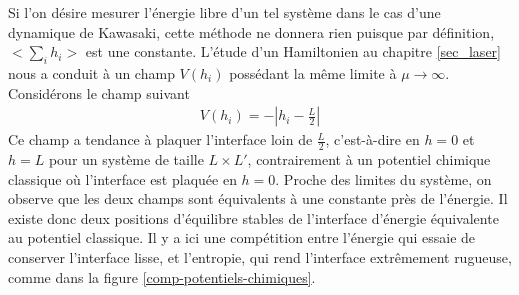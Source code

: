 Si l'on désire mesurer l'énergie libre d'un tel système dans le cas d'une dynamique de Kawasaki, cette méthode ne donnera rien puisque par définition, $<\sum_i h_i>$ est une constante. L'étude d'un Hamiltonien au chapitre \ref{sec_laser} nous a conduit à un champ $V(h_i)$ possédant la même limite à $\mu \to \infty$. Considérons le champ suivant
\begin{align}
    V(h_i) = - |h_i-\frac{L}{2}|
    \label{neggstaged}
\end{align}
Ce champ a tendance à plaquer l'interface loin de $\frac{L}{2}$, c'est-à-dire en $h=0$ et $h=L$ pour un système de taille $L\times L'$, contrairement à un potentiel chimique classique où l'interface est plaquée en $h=0$. Proche des limites du système, on observe que les deux champs sont équivalents à une constante près de l'énergie. Il existe donc deux positions d'équilibre stables de l'interface d'énergie équivalente au potentiel classique. Il y a ici une compétition entre l'énergie qui essaie de conserver l'interface lisse, et l'entropie, qui rend l'interface extrêmement rugueuse, comme dans la figure \ref{comp-potentiels-chimiques}.

